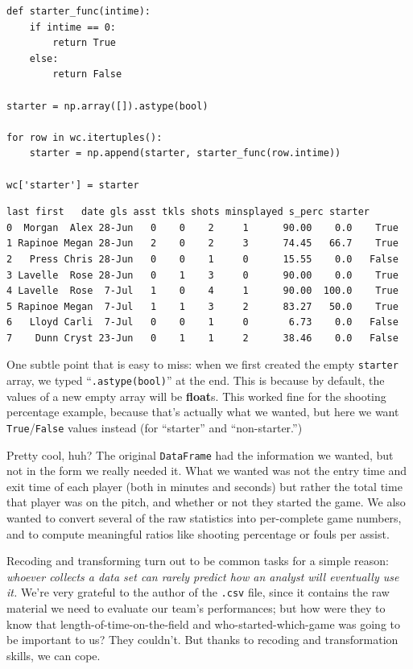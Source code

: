 \begin{Verbatim}[fontsize=\small,samepage=true,frame=single,framesep=3mm]
def starter_func(intime):
    if intime == 0:
        return True
    else:
        return False

starter = np.array([]).astype(bool)

for row in wc.itertuples():
    starter = np.append(starter, starter_func(row.intime))

wc['starter'] = starter
\end{Verbatim}
\vspace{-.2in}

\begin{Verbatim}[fontsize=\CBCodeSmall,samepage=true,frame=leftline,framesep=5mm,framerule=1mm]
     last first   date gls asst tkls shots minsplayed s_perc starter
0  Morgan  Alex 28-Jun   0    0    2     1      90.00    0.0    True
1 Rapinoe Megan 28-Jun   2    0    2     3      74.45   66.7    True
2   Press Chris 28-Jun   0    0    1     0      15.55    0.0   False
3 Lavelle  Rose 28-Jun   0    1    3     0      90.00    0.0    True
4 Lavelle  Rose  7-Jul   1    0    4     1      90.00  100.0    True
5 Rapinoe Megan  7-Jul   1    1    3     2      83.27   50.0    True
6   Lloyd Carli  7-Jul   0    0    1     0       6.73    0.0   False
7    Dunn Cryst 23-Jun   0    1    1     2      38.46    0.0   False
\end{Verbatim}


One subtle point that is easy to miss: when we first created the empty
\texttt{starter} array, we typed ``\texttt{.astype(bool)}'' at the end. This is
because by default, the values of a new empty array will be \textbf{float}s.
This worked fine for the shooting percentage example, because that's actually
what we wanted, but here we want \texttt{True}/\texttt{False} values instead
(for ``starter'' and ``non-starter.'')

Pretty cool, huh? The original \texttt{DataFrame} had the information we
wanted, but not in the form we really needed it. What we wanted was not the
entry time and exit time of each player (both in minutes and seconds) but
rather the total time that player was on the pitch, and whether or not they
started the game. We also wanted to convert several of the raw statistics into
per-complete game numbers, and to compute meaningful ratios like shooting
percentage or fouls per assist.

\bigskip

Recoding and transforming turn out to be common tasks for a simple reason:
\textit{whoever collects a data set can rarely predict how an analyst will
eventually use it.} We're very grateful to the author of the \texttt{.csv}
file, since it contains the raw material we need to evaluate our team's
performances; but how were they to know that length-of-time-on-the-field and
who-started-which-game was going to be important to us? They couldn't. But
thanks to recoding and transformation skills, we can cope.

